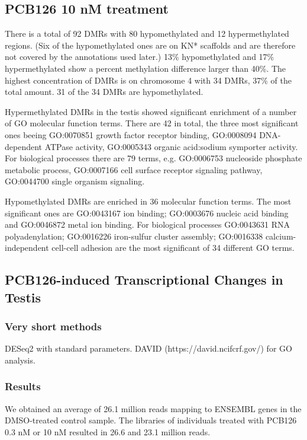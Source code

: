 \documentclass{article}
\newcommand{\TODO}[1]{\begingroup\color{red}Todo: #1\endgroup}
\begin{document}
\subsection{PCB126 10 nM treatment}
There is a total of 92 DMRs with 80 hypomethylated and 12
hypermethylated regions. (Six of the hypomethylated ones are on KN*
scaffolds and are therefore not covered by the annotations used later.)
13\% hypomethylated and 17\% hypermethylated show a percent
methylation difference larger than 40\%. The highest concentration of
DMRs is on chromosome 4 with 34 DMRs, 37\% of the total amount. 31 of
the 34 DMRs are hypomethylated.

Hypermethylated DMRs in the testis showed significant enrichment of a
number of GO molecular function terms. There are 42 in total, the
three most significant ones beeing GO:0070851 growth factor receptor
binding, GO:0008094 DNA-dependent ATPase activity, GO:0005343 organic
acid:sodium symporter activity. For biological processes there are 79
terms, e.g. GO:0006753 nucleoside phosphate metabolic process,
GO:0007166 cell surface receptor signaling pathway, GO:0044700 single
organism signaling.

Hypomethylated DMRs are enriched in 36 molecular function terms. The
most significant ones are GO:0043167 ion binding; GO:0003676 nucleic
acid binding and GO:0046872 metal ion binding. For biological
processes GO:0043631 RNA polyadenylation; GO:0016226 iron-sulfur
cluster assembly; GO:0016338 calcium-independent cell-cell adhesion
are the most significant of 34 different GO terms.

\subsection{PCB126-induced Transcriptional Changes in Testis}

\subsubsection{Very short methods}
DESeq2 with standard parameters. DAVID (https://david.ncifcrf.gov/)
for GO analysis.

\subsubsection{Results}
We obtained an average of 26.1 million reads mapping to ENSEMBL genes
in the DMSO-treated control sample. The libraries of individuals
treated with PCB126 0.3 nM or 10 nM resulted in 26.6 and 23.1 million
reads.
\end{document}
